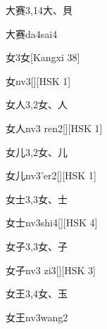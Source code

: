 \begin{entry}{大赛}{3,14}{⼤、⾙}
  \begin{phonetics}{大赛}{da4sai4}
  \end{phonetics}
\end{entry}

\begin{entry}{女}{3}{⼥}[Kangxi 38]
  \begin{phonetics}{女}{nv3}[][HSK 1]
  \end{phonetics}
\end{entry}

\begin{entry}{女人}{3,2}{⼥、⼈}
  \begin{phonetics}{女人}{nv3 ren2}[][HSK 1]
  \end{phonetics}
\end{entry}

\begin{entry}{女儿}{3,2}{⼥、⼉}
  \begin{phonetics}{女儿}{nv3'er2}[][HSK 1]
  \end{phonetics}
\end{entry}

\begin{entry}{女士}{3,3}{⼥、⼠}
  \begin{phonetics}{女士}{nv3shi4}[][HSK 4]
  \end{phonetics}
\end{entry}

\begin{entry}{女子}{3,3}{⼥、⼦}
  \begin{phonetics}{女子}{nv3 zi3}[][HSK 3]
  \end{phonetics}
\end{entry}

\begin{entry}{女王}{3,4}{⼥、⽟}
  \begin{phonetics}{女王}{nv3wang2}
  \end{phonetics}
\end{entry}

